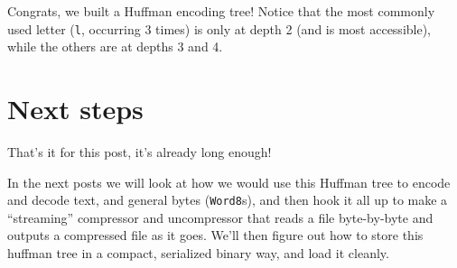 \documentclass[]{article}
\newenvironment{Shaded}{}{}
\newcommand{\CharTok}[1]{\textcolor[rgb]{0.25,0.44,0.63}{#1}}
\newcommand{\DataTypeTok}[1]{\textcolor[rgb]{0.56,0.13,0.00}{#1}}
\newcommand{\NormalTok}[1]{#1}
\newcommand{\OperatorTok}[1]{\textcolor[rgb]{0.40,0.40,0.40}{#1}}
\newcommand{\StringTok}[1]{\textcolor[rgb]{0.25,0.44,0.63}{#1}}
\begin{document}
\begin{Shaded}
\end{Shaded}

Congrats, we built a Huffman encoding tree! Notice that the most commonly used
letter (\texttt{\textquotesingle{}l\textquotesingle{}}, occurring 3 times) is
only at depth 2 (and is most accessible), while the others are at depths 3 and
4.

\section{Next steps}\label{next-steps}

That's it for this post, it's already long enough!

In the next posts we will look at how we would use this Huffman tree to encode
and decode text, and general bytes (\texttt{Word8}s), and then hook it all up to
make a ``streaming'' compressor and uncompressor that reads a file byte-by-byte
and outputs a compressed file as it goes. We'll then figure out how to store
this huffman tree in a compact, serialized binary way, and load it cleanly.
\end{document}
